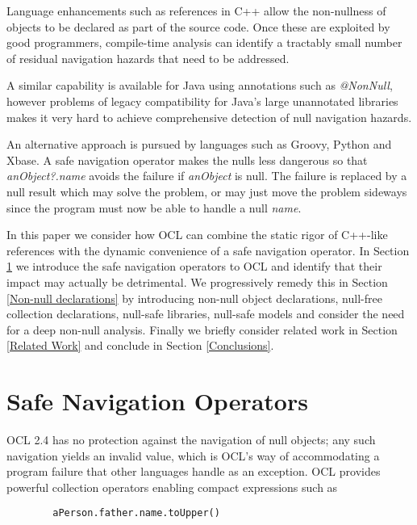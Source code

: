 \documentclass{llncs}
\begin{document}
Language enhancements such as references\cite{c++-references} in C++ allow the non-nullness of objects to be declared as part of the source code. Once these are exploited by good programmers, compile-time analysis can identify a tractably small number of residual navigation hazards that need to be addressed.

A similar capability is available for Java using annotations such as \emph{@NonNull}\cite{java-NonNull}, however problems of legacy compatibility for Java's large unannotated libraries makes it very hard to achieve comprehensive detection of null navigation hazards.

An alternative approach is pursued by languages such as Groovy\cite{groovy}, Python\cite{python} and Xbase\cite{xbase}. A safe navigation operator makes the nulls less dangerous so that \emph{anObject?.name} avoids the failure if \emph{anObject} is null. The failure is replaced by a null result which may solve the problem, or may just move the problem sideways since the program must now be able to handle a null \emph{name}.

In this paper we consider how OCL can combine the static rigor of C++-like references with the dynamic convenience of a safe navigation operator. In Section \ref{Safe Navigation Operators} we introduce the safe navigation operators to OCL and identify that their impact may actually be detrimental. We progressively remedy this in Section \ref{Non-null declarations} by introducing non-null object declarations, null-free collection declarations, null-safe libraries, null-safe models and consider the need for a deep non-null analysis. Finally we briefly consider related work in Section \ref{Related Work} and conclude in Section \ref{Conclusions}.

\section{Safe Navigation Operators}\label{Safe Navigation Operators}

OCL 2.4\cite{OCL-2.4} has no protection against the navigation of null objects; any such navigation yields an invalid value, which is OCL's way of accommodating a program failure that other languages handle as an exception. OCL provides powerful collection operators enabling compact expressions such as

\begin{verbatim}
        aPerson.father.name.toUpper()
\end{verbatim}
\end{document}
